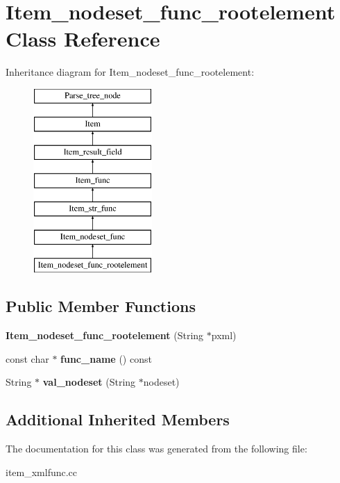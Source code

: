 \hypertarget{classItem__nodeset__func__rootelement}{}\section{Item\+\_\+nodeset\+\_\+func\+\_\+rootelement Class Reference}
\label{classItem__nodeset__func__rootelement}
Inheritance diagram for Item\+\_\+nodeset\+\_\+func\+\_\+rootelement\+:\begin{figure}[H]
\begin{center}
\leavevmode
\includegraphics[height=7.000000cm]{classItem__nodeset__func__rootelement}
\end{center}
\end{figure}
\subsection*{Public Member Functions}
\begin{DoxyCompactItemize}
\item 
\mbox{\label{classItem__nodeset__func__rootelement_a4c45344975875395d82cf1d1602a2c34}} 
{\bfseries Item\+\_\+nodeset\+\_\+func\+\_\+rootelement} (String $\ast$pxml)
\item 
\mbox{\label{classItem__nodeset__func__rootelement_a967c5fd6c437581082b1f0893d128439}} 
const char $\ast$ {\bfseries func\+\_\+name} () const
\item 
\mbox{\label{classItem__nodeset__func__rootelement_afcfa4f4eff1885204068f548c0e5fe1e}} 
String $\ast$ {\bfseries val\+\_\+nodeset} (String $\ast$nodeset)
\end{DoxyCompactItemize}
\subsection*{Additional Inherited Members}


The documentation for this class was generated from the following file\+:\begin{DoxyCompactItemize}
\item 
item\+\_\+xmlfunc.\+cc\end{DoxyCompactItemize}
